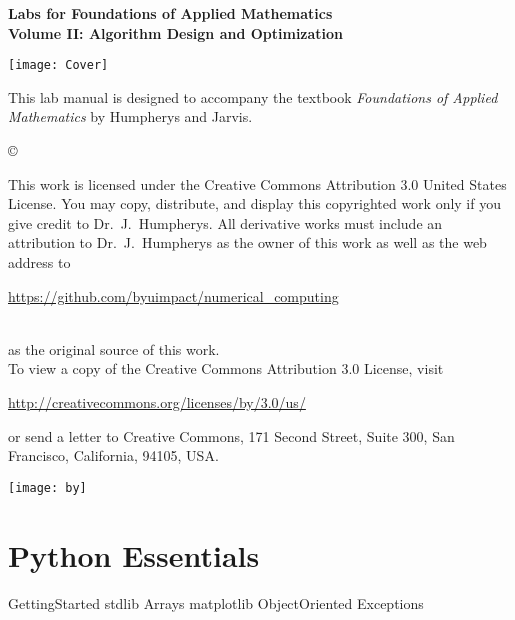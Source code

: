 \documentclass[nociteref]{SIAM-GH-book}
\begin{document}
\thispagestyle{empty}

\begin{center}
{\huge \bf Labs for Foundations of Applied Mathematics} \\
\vspace{5mm}
{\Large \bf Volume II: Algorithm
Design and Optimization}
\vspace{20mm}

\texttt{[image: Cover]}
\end{center}
\frontmatter




\begin{thepreface}
This lab manual is designed to accompany the textbook \emph{Foundations of Applied Mathematics} by Humpherys and Jarvis.

\vfill
\copyright{This work is licensed under the Creative Commons Attribution 3.0 United States
License.  You may copy, distribute, and display this copyrighted work only if you give
credit to Dr.~J.~Humpherys. All derivative works must include an attribution to Dr.~J.~Humpherys as the owner of this work as well as the web address to
\\\centerline{\url{https://github.com/byuimpact/numerical_computing}}\\ as the original source of
this
work.\\To view a copy of the Creative Commons Attribution 3.0 License,
visit\\\centerline{\url{http://creativecommons.org/licenses/by/3.0/us/}} or send a letter to
Creative Commons, 171 Second Street, Suite 300, San Francisco, California, 94105, USA.}

\vfill
\centering\texttt{[image: by]}
\vfill
\end{thepreface}

\setcounter{tocdepth}{1}
\tableofcontents

\mainmatter

\part{Python Essentials}
{GettingStarted}
{stdlib}
{Arrays}
{matplotlib}
{ObjectOriented}
{Exceptions}
\end{document}
